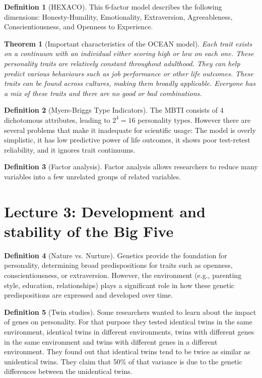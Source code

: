 \documentclass{article}
\newtheorem{theorem}{Theorem}
\theoremstyle{definition}
\newtheorem{definition}{Definition}
\theoremstyle{Solution}
\begin{document}
\begin{definition}[HEXACO]
This 6-factor model describes the following dimensions: Honesty-Humility, Emotionality, Extraversion, Agreeableness, Conscientiousness, and Openness to Experience.
\end{definition}

\begin{theorem}[Important characteristics of the OCEAN model]
Each trait exists on a continuum with an individual either scoring high or low on each one. These personality traits are relatively constant throughout adulthood. They can help predict various behaviours such as job performance or other life outcomes. These traits can be found across cultures, making them broadly applicable. Everyone has a mix of these traits and there are no good or bad combinations.
\end{theorem}

\begin{definition}[Myers-Briggs Type Indicators]
The MBTI consists of 4 dichotomous attributes, leading to \(2^4=16\) personality types. However there are several problems that make it inadequate for scientific usage: The model is overly simplistic, it has low predictive power of life outcomes, it shows poor test-retest reliability, and it ignores trait continuums.
\end{definition}

\begin{definition}[Factor analysis]
Factor analysis allows researchers to reduce many variables into a few unrelated groups of related variables.
\end{definition}

\section{Lecture 3: Development and stability of the Big Five}

\begin{definition}[Nature vs. Nurture]
Genetics provide the foundation for personality, determining broad predispositions for traits such as openness, conscientiousness, or extraversion. However, the environment (e.g., parenting style, education, relationships) plays a significant role in how these genetic predispositions are expressed and developed over time.
\end{definition}

\begin{definition}[Twin studies]
Some researchers wanted to learn about the impact of genes on personality. For that purpose they tested identical twins in the same environment, identical twins in different environments, twins with different genes in the same environment and twins with different genes in a different environment. They found out that identical twins tend to be twice as similar as unidentical twins. They claim that 50\% of that variance is due to the genetic differences between the unidentical twins.
\end{definition}
\end{document}
